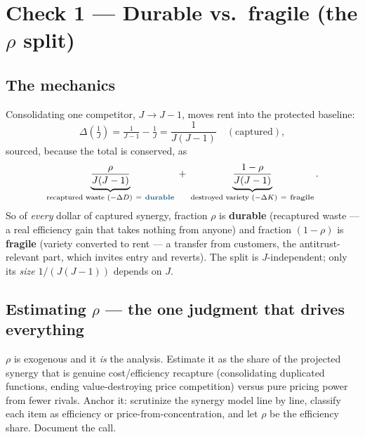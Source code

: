 \documentclass[11pt]{article}
\newcommand{\durable}{\textcolor{creoaccent}{\textbf{durable}}}
\newcommand{\fragile}{\textcolor{gray!55!black}{\textbf{fragile}}}
\begin{document}
\section{Check 1 --- Durable vs.\ fragile (the $\rho$ split)}

\subsection{The mechanics}
Consolidating one competitor, $J\to J-1$, moves rent into the protected baseline:
\[
  \Delta\!\left(\tfrac{1}{J}\right)=\tfrac{1}{J-1}-\tfrac1J=\frac{1}{J(J-1)}\quad(\text{captured}),
\]
sourced, because the total is conserved, as
\[
  \underbrace{\frac{\rho}{J(J-1)}}_{\text{recaptured waste }(-\Delta D)\ =\ \durable}
  \;+\;
  \underbrace{\frac{1-\rho}{J(J-1)}}_{\text{destroyed variety }(-\Delta K)\ =\ \fragile}.
\]
So of \emph{every} dollar of captured synergy, fraction $\rho$ is \durable{} (recaptured
waste --- a real efficiency gain that takes nothing from anyone) and fraction $(1-\rho)$ is
\fragile{} (variety converted to rent --- a transfer from customers, the antitrust-relevant
part, which invites entry and reverts). The split is $J$-independent; only its \emph{size}
$1/(J(J-1))$ depends on $J$.

\subsection{Estimating $\rho$ --- the one judgment that drives everything}
\begin{judgment}
$\rho$ is exogenous and it \emph{is} the analysis. Estimate it as the share of the projected
synergy that is genuine cost/efficiency recapture (consolidating duplicated functions,
ending value-destroying price competition) versus pure pricing power from fewer rivals. Anchor
it: scrutinize the synergy model line by line, classify each item as efficiency or
price-from-concentration, and let $\rho$ be the efficiency share. Document the call.
\end{judgment}
\end{document}
